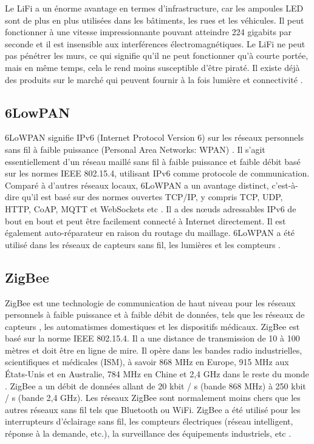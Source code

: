 Le LiFi a un énorme avantage en termes d'infrastructure, car les ampoules LED sont de plus en plus utilisées dans les bâtiments, les rues et les véhicules. Il peut fonctionner à une vitesse impressionnante pouvant atteindre 224 gigabits par seconde et il est insensible aux interférences électromagnétiques. Le LiFi ne peut pas pénétrer les murs, ce qui signifie qu'il ne peut fonctionner qu'à courte portée, mais en même temps, cela le rend moins susceptible d'être piraté. Il existe déjà des produits sur le marché qui peuvent fournir à la fois lumière et connectivité \cite{bokefode2018retrieving}.
\subsection{6LowPAN}
6LoWPAN signifie IPv6 (Internet Protocol Version 6) sur les réseaux personnels sans fil à faible puissance (Personal Area Networks: WPAN) \cite{catarinucci2015iot}. Il s'agit essentiellement d'un réseau maillé sans fil à faible puissance et faible débit basé sur les normes IEEE 802.15.4, utilisant IPv6 comme protocole de communication. Comparé à d'autres réseaux locaux, 6LoWPAN a un avantage distinct, c'est-à-dire qu'il est basé sur des normes ouvertes TCP/IP, y compris TCP, UDP, HTTP, CoAP, MQTT et WebSockets etc \cite{pongle2015survey}. Il a des nœuds adressables IPv6 de bout en bout et peut être facilement connecté à Internet directement. Il est également auto-réparateur en raison du routage du maillage. 6LoWPAN a été utilisé dans les réseaux de capteurs sans fil, les lumières et les compteurs \cite{gomez20176lowpan}.
\subsection{ZigBee}
ZigBee est une technologie de communication de haut niveau pour les réseaux personnels à faible puissance et à faible débit de données, tels que les réseaux de capteurs \cite{feng2008zigbee}, les automatismes domestiques et les dispositifs médicaux. ZigBee est basé sur la norme IEEE 802.15.4. Il a une distance de transmission de 10 à 100 mètres et doit être en ligne de mire. Il opère dans les bandes radio industrielles, scientifiques et médicales (ISM), à savoir 868 MHz en Europe, 915 MHz aux États-Unis et en Australie, 784 MHz en Chine et 2,4 GHz dans le reste du monde \cite{markovtechnical}. ZigBee a un débit de données allant de 20 kbit / s (bande 868 MHz) à 250 kbit / s (bande 2,4 GHz). Les réseaux ZigBee sont normalement moins chers que les autres réseaux sans fil tels que Bluetooth ou WiFi. ZigBee a été utilisé pour les interrupteurs d'éclairage sans fil, les compteurs électriques (réseau intelligent, réponse à la demande, etc.), la surveillance des équipements industriels, etc \cite{hasan1999intelligent}.


